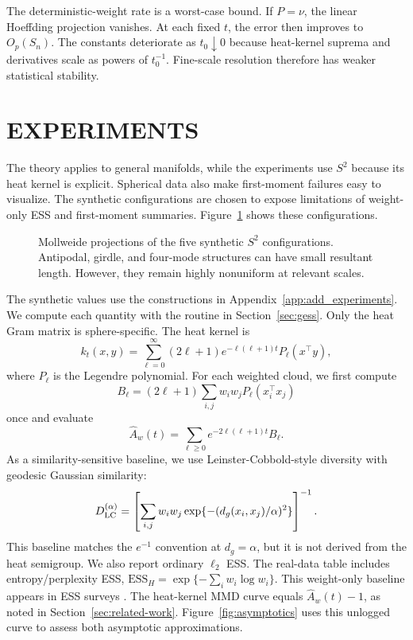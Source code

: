 \documentclass[twoside]{article}
\theoremstyle{definition}
\theoremstyle{remark}
\newcommand{\ess}{\mathrm{ESS}}
\begin{document}
The deterministic-weight rate is a worst-case bound. If $P=\nu$, the linear Hoeffding projection vanishes. At each fixed $t$, the error then improves to $O_p(S_n)$. The constants deteriorate as $t_0\downarrow0$ because heat-kernel suprema and derivatives scale as powers of $t_0^{-1}$. Fine-scale resolution therefore has weaker statistical stability.

\section{EXPERIMENTS}\label{sec:experiments}

The theory applies to general manifolds, while the experiments use $S^2$ because its heat kernel is explicit. Spherical data also make first-moment failures easy to visualize. The synthetic configurations are chosen to expose limitations of weight-only ESS and first-moment summaries. Figure~\ref{fig:clouds} shows these configurations.
\begin{figure}[ht]
\centering

\caption{Mollweide projections of the five synthetic $S^2$ configurations. Antipodal, girdle, and four-mode structures can have small resultant length. However, they remain highly nonuniform at relevant scales.}
\label{fig:clouds}
\end{figure}

The synthetic values use the constructions in Appendix~\ref{app:add_experiments}. We compute each quantity with the routine in Section~\ref{sec:gess}. Only the heat Gram matrix is sphere-specific. The heat kernel is
\begin{equation*}
  k_t(x,y)=\sum_{\ell=0}^{\infty}(2\ell+1)e^{-\ell(\ell+1)t}P_\ell(x^\top y),
\end{equation*}
where $P_\ell$ is the Legendre polynomial. For each weighted cloud, we first compute
\begin{equation*}
  B_\ell=(2\ell+1)\sum_{i,j}w_iw_jP_\ell(x_i^\top x_j)
\end{equation*}
once and evaluate
\begin{equation*}
  \widehat A_w(t)=\sum_{\ell\ge0}e^{-2\ell(\ell+1)t}B_\ell.
\end{equation*}
As a similarity-sensitive baseline, we use Leinster-Cobbold-style diversity with geodesic Gaussian similarity:
\begin{equation*}
  D_{\rm LC}^{(\alpha)}=\left[\sum_{i,j}w_iw_j\exp\{-(d_g(x_i,x_j)/\alpha)^2\}\right]^{-1}.
\end{equation*}
This baseline matches the $e^{-1}$ convention at $d_g=\alpha$, but it is not derived from the heat semigroup.
We also report ordinary $\ell_2$ ESS. The real-data table includes entropy/perplexity ESS, $\ess_H=\exp\{-\sum_iw_i\log w_i\}$. This weight-only baseline appears in ESS surveys \citep{martino_2017_EffectiveSampleSize}. The heat-kernel MMD curve equals $\widehat A_w(t)-1$, as noted in Section~\ref{sec:related-work}. Figure~\ref{fig:asymptotics} uses this unlogged curve to assess both asymptotic approximations.
\end{document}
